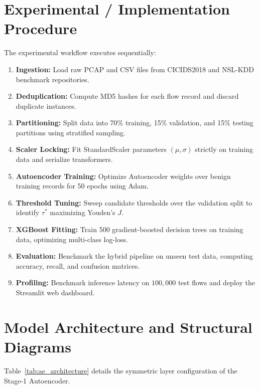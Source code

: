 \documentclass[12pt,a4paper]{report}
\begin{document}
\section{Experimental / Implementation Procedure}
The experimental workflow executes sequentially:
\begin{enumerate}
    \item \textbf{Ingestion:} Load raw PCAP and CSV files from CICIDS2018 and NSL-KDD benchmark repositories.
    \item \textbf{Deduplication:} Compute MD5 hashes for each flow record and discard duplicate instances.
    \item \textbf{Partitioning:} Split data into 70\% training, 15\% validation, and 15\% testing partitions using stratified sampling.
    \item \textbf{Scaler Locking:} Fit StandardScaler parameters $(\mu, \sigma)$ strictly on training data and serialize transformers.
    \item \textbf{Autoencoder Training:} Optimize Autoencoder weights over benign training records for 50 epochs using Adam.
    \item \textbf{Threshold Tuning:} Sweep candidate thresholds over the validation split to identify $\tau^*$ maximizing Youden's $J$.
    \item \textbf{XGBoost Fitting:} Train 500 gradient-boosted decision trees on training data, optimizing multi-class log-loss.
    \item \textbf{Evaluation:} Benchmark the hybrid pipeline on unseen test data, computing accuracy, recall, and confusion matrices.
    \item \textbf{Profiling:} Benchmark inference latency on $100{,}000$ test flows and deploy the Streamlit web dashboard.
\end{enumerate}

\section{Model Architecture and Structural Diagrams}
Table~\ref{tab:ae_architecture} details the symmetric layer configuration of the Stage-1 Autoencoder.
\end{document}
